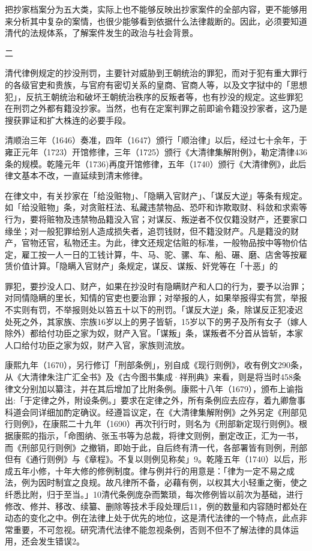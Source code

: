 把抄家档案分为五大类，实际上也不能够反映出抄家案件的全部内容，更不能够用来分析其中复杂的案情，也很少能够看到依据什么法律裁断的。因此，必须要知道清代的法规体系，了解案件发生的政治与社会背景。

二

清代律例规定的抄没刑罚，主要针对威胁到王朝统治的罪犯，而对于犯有重大罪行的各级官吏和贵族，与官府有密切关系的皇商、官商人等，以及文字狱中的「思想犯」，反抗王朝统治和破坏王朝统治秩序的反叛者等，也有抄没的规定。这些罪犯在刑罚之外都有籍没抄家。当然，也有在定案判罪之前即谕令籍没抄家者，这乃是搜获罪证和扩大株连的必要手段。

清顺治三年（1646）奏准，四年（1647）颁行「顺治律」以后，经过七十余年，于雍正元年（1723）开馆修律，三年（1725）颁行《大清律集解附例》，勒定清律436条的规模。乾隆元年（1736)再度开馆修律，五年（1740）颁行《大清律例》，此后律文基本不改，一直延续到清末修律。

在律文中，有关抄家在「给没赃物」、「隐瞒入官财产」、「谋反大逆」等条有规定。如「给没赃物」条，对贪赃枉法、私藏违禁物品、恐吓和诈欺取财、科敛和求索等行为，要将赃物及违禁物品籍没入官；对谋反、叛逆者不仅仅籍没财产，还要家口缘坐；对一般犯罪给别人造成损失者，追罚钱财，但不籍没财产。凡是籍没的财产，官物还官，私物还主。为此，律文还规定估赃的标准，一般物品按中等物价估定，雇工按一人一日的工钱计算，牛、马、驼、骡、车、船、碾、磨、店舍等按雇赁价值计算。「隐瞒入官财产」条规定，谋反、谋叛、奸党等在「十恶」的


\noindent 罪犯，要抄没人口、财产，如果在抄没时有隐瞒财产和人口的行为，要予以治罪；对同情隐瞒的里长，知情的官吏也要治罪；对举报的人，如果举报得实有赏，举报不实则有罚，不举报则处以笞五十以下的刑罚。「谋反大逆」条，除谋反正犯凌迟处死之外，其家族、宗族16岁以上的男子皆斩，15岁以下的男子及所有女子（嫁人除外）都给付功臣之家为奴，财产入官。「谋叛」条，谋叛者不分首从皆斩，本家人口给付功臣之家为奴，财产入官，家族则流放。

康熙九年（1670），另行修订「刑部条例」，别自成《现行则例》，收有例文290条，从《大清律朱注广汇全书》及《古今图书集成·祥刑典》来看，则是将当时458条律文分别加以纂注，并在其后增加了比附条例。康熙十八年（1679），颁布上谕指出:「于定律之外，附设条例。」要求在定律之外，所有条例应去应存，着九卿詹事科道会同详细加酌定确议。经遵旨议定，在《大清律集解附例》之外另定《刑部见行则例》，在康熙二十九年（1690）再次刊行时，则名为《刑部新定现行则例》。根据康熙的指示，「命图纳、张玉书等为总裁，将律文则例，删定改正，汇为一书，而《刑部见行则例》之撤销，即始于此，自后终有清一代，各部署皆有则例，刑部但有《通行则例》与《章程》。不复以则例见称矣」9。乾隆五年（1740）以后，形成五年小修，十年大修的修例制度。律与例并行的用意是：「律为一定不易之成法，例为因时制宜之良规。故凡律所不备，必藉有例，以权其大小轻重之衡，使之纤悉比附，归于至当。」10清代条例庞杂而繁琐，每次修例皆以前次为基础，进行修改、修并、移改、续纂、删除等技术手段处理后11，例的数量和内容随时都处在动态的变化之中。例在法律上处于优先的地位，这是清代法律的一个特点，此点非常重要，不可忽视。研究清代法律不能忽视条例，否则不但不了解法律的具体运用，还会发生错误2。

